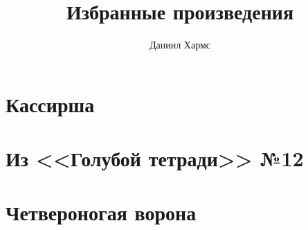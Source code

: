 \documentclass[12pt]{book}
\title{Избранные произведения}
\author{Даниил Хармс}
\date{}
\begin{document}
\maketitle

\chapter{Кассирша}


\chapter{Из <<Голубой тетради>> №12}


\chapter{Четвероногая ворона}

      
\end{document}
